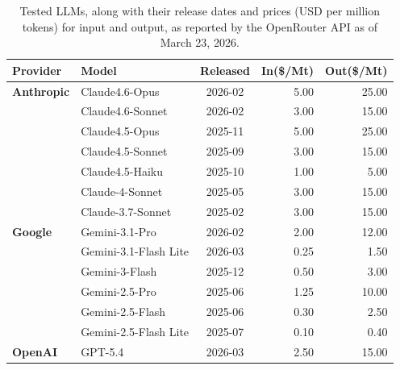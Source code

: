 \documentclass[12pt,a4paper]{article}
\begin{document}
\begin{table}[h]
\caption{Tested LLMs, along with their release dates and prices (USD per million tokens) for input and output, as reported by the OpenRouter API as of March 23, 2026.}
\label{tab:LLMs}
\begin{tabular}{@{}llcrr@{}}
\toprule
\textbf{Provider}  & \textbf{Model}            & \textbf{Released} & \textbf{In(\$/Mt)} & \textbf{Out(\$/Mt)} \\ \midrule
\textbf{Anthropic} & Claude4.6-Opus             & 2026-02           & 5.00               & 25.00               \\
                   & Claude4.6-Sonnet           & 2026-02           & 3.00               & 15.00               \\
                   & Claude4.5-Opus             & 2025-11           & 5.00               & 25.00               \\
                   & Claude4.5-Sonnet           & 2025-09           & 3.00               & 15.00               \\
                   & Claude4.5-Haiku            & 2025-10           & 1.00               & 5.00                \\
                   & Claude-4-Sonnet             & 2025-05           & 3.00               & 15.00               \\
                   & Claude-3.7-Sonnet           & 2025-02           & 3.00               & 15.00               \\ \midrule
\textbf{Google}    & Gemini-3.1-Pro       & 2026-02           & 2.00               & 12.00               \\
                   & Gemini-3.1-Flash Lite & 2026-03           & 0.25               & 1.50                \\
                   & Gemini-3-Flash       & 2025-12           & 0.50               & 3.00                \\
                   & Gemini-2.5-Pro              & 2025-06           & 1.25               & 10.00               \\
                   & Gemini-2.5-Flash            & 2025-06           & 0.30               & 2.50                \\
                   & Gemini-2.5-Flash Lite        & 2025-07           & 0.10               & 0.40                \\ \midrule
\textbf{OpenAI}    & GPT-5.4                   & 2026-03           & 2.50               & 15.00               \\

\end{tabular}
\end{table}
\end{document}
